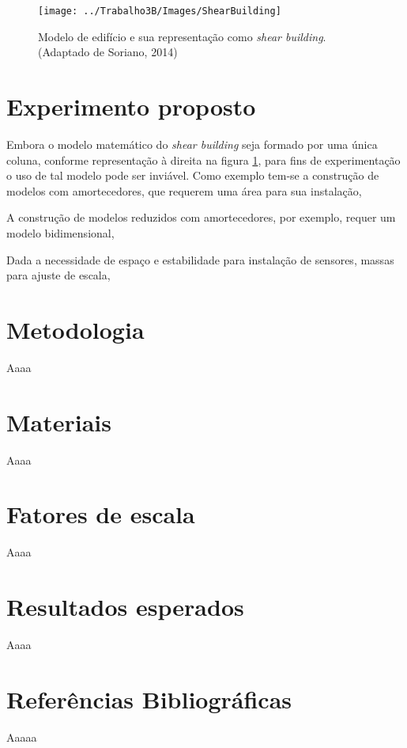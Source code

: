 \begin{figure}
	\centering
	\caption{Modelo de edifício e sua representação como \textit{shear building}.\\ \small{(Adaptado de Soriano, 2014)}}
	\texttt{[image: ../Trabalho3B/Images/ShearBuilding]}
	\label{fig:shearb}
\end{figure}



\section{Experimento proposto}

Embora o modelo matemático do \textit{shear building} seja formado por uma única coluna, conforme representação à direita na figura \ref{fig:shearb}, para fins de experimentação o uso de tal modelo pode ser inviável. Como exemplo tem-se a construção de modelos com amortecedores, que requerem uma área para sua instalação, 

A construção de modelos reduzidos com amortecedores, por exemplo, requer um modelo bidimensional, 

Dada a necessidade de espaço e estabilidade para instalação de sensores, massas para ajuste de escala, 



\section{Metodologia}
Aaaa


\section{Materiais}
Aaaa


\section{Fatores de escala}
Aaaa


\section{Resultados esperados}
Aaaa


\section{Referências Bibliográficas}
Aaaaa
    



